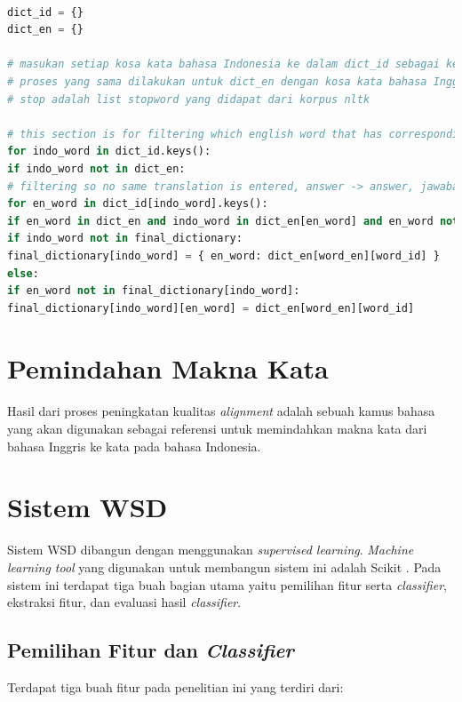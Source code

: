 \begin{lstlisting}[language=Python, caption={Word Alignment Enhancement}, label={word-alignment-enhancement}]

dict_id = {}
dict_en = {}

# masukan setiap kosa kata bahasa Indonesia ke dalam dict_id sebagai key dan kumpulan pasangan kata bahasa inggrisnya sebagai value
# proses yang sama dilakukan untuk dict_en dengan kosa kata bahasa Inggris sebagai key dan kumpulan pasangan kata bahasa Indonesia sebagai value
# stop adalah list stopword yang didapat dari korpus nltk

# this section is for filtering which english word that has corresponding indo translation (bidirectional) from Giza output
for indo_word in dict_id.keys():
if indo_word not in dict_en:
# filtering so no same translation is entered, answer -> answer, jawaban -> jawaban
for en_word in dict_id[indo_word].keys():
if en_word in dict_en and indo_word in dict_en[en_word] and en_word not in stop:
if indo_word not in final_dictionary:
final_dictionary[indo_word] = { en_word: dict_en[word_en][word_id] }
else:
if en_word not in final_dictionary[indo_word]:
final_dictionary[indo_word][en_word] = dict_en[word_en][word_id]
\end{lstlisting}


\section{Pemindahan Makna Kata}
Hasil dari proses peningkatan kualitas \textit{alignment} adalah sebuah kamus bahasa yang akan digunakan sebagai referensi untuk memindahkan makna kata dari bahasa Inggris ke kata pada bahasa Indonesia.


\section{Sistem WSD}
Sistem WSD dibangun dengan menggunakan \textit{supervised learning}. \textit{Machine learning tool} yang digunakan untuk membangun sistem ini adalah Scikit \citep{scikit-learn}. Pada sistem ini terdapat tiga buah bagian utama yaitu pemilihan fitur serta \textit{classifier}, ekstraksi fitur, dan evaluasi hasil \textit{classifier}.

\subsection{Pemilihan Fitur dan \textit{Classifier}}
Terdapat tiga buah fitur pada penelitian ini yang terdiri dari:

